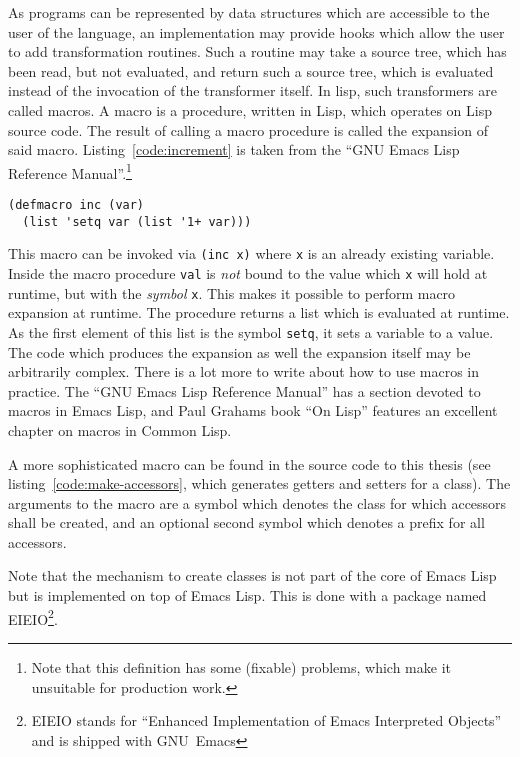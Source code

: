 \documentclass[a4paper,10pt,twoside]{report}
\newcommand{\el}{Emacs Lisp}
\newcommand{\cl}{Common Lisp}
\newcommand{\sym}[1]{\texttt{#1}}
\newcommand{\emacs}{GNU~Emacs}
\begin{document}
As programs can be represented by data structures which are accessible to the
user of the language, an implementation may provide hooks which allow the user
to add transformation routines.  Such a routine may take a source tree, which
has been read, but not evaluated, and return such a source tree, which is
evaluated instead of the invocation of the transformer itself.  In lisp, such
transformers are called macros.  A macro is a procedure, written in Lisp, which
operates on Lisp source code.  The result of calling a macro procedure is called
the expansion of said macro.  Listing~\ref{code:increment} is taken from the
``GNU Emacs Lisp Reference Manual''.\footnote{Note that this definition has some
  (fixable) problems, which make it unsuitable for production work.}

\pagebreak

\begin{lstlisting}[style=lispcode,caption={Increment as a
      macro.},label={code:increment}]
(defmacro inc (var)
  (list 'setq var (list '1+ var)))
\end{lstlisting}

This macro can be invoked via \texttt{(inc x)} where \sym{x} is an already
existing variable.  Inside the macro procedure \sym{val} is \emph{not} bound to
the value which \sym{x} will hold at runtime, but with the \emph{symbol}
\sym{x}.  This makes it possible to perform macro expansion at runtime.  The
procedure returns a list which is evaluated at runtime.  As the first element of
this list is the symbol \sym{setq}, it sets a variable to a value.  The code
which produces the expansion as well the expansion itself may be arbitrarily
complex.  There is a lot more to write about how to use macros in practice.  The
``GNU Emacs Lisp Reference Manual'' has a section devoted to macros in \el, and
Paul Grahams book ``On Lisp'' \cite{on-lisp} features an excellent chapter on
macros in \cl{}.

A more sophisticated macro can be found in the source code to this thesis (see
listing~\ref{code:make-accessors}, which generates getters and setters for a
class).  The arguments to the macro are a symbol which denotes the class for
which accessors shall be created, and an optional second symbol which denotes a
prefix for all accessors.

Note that the mechanism to create classes is not part of the core of \el{} but
is implemented on top of \el{}.  This is done with a package named
EIEIO\footnote{EIEIO stands for “Enhanced Implementation of Emacs Interpreted
  Objects” and is shipped with \emacs{}}.\cite{eieio}
\end{document}
